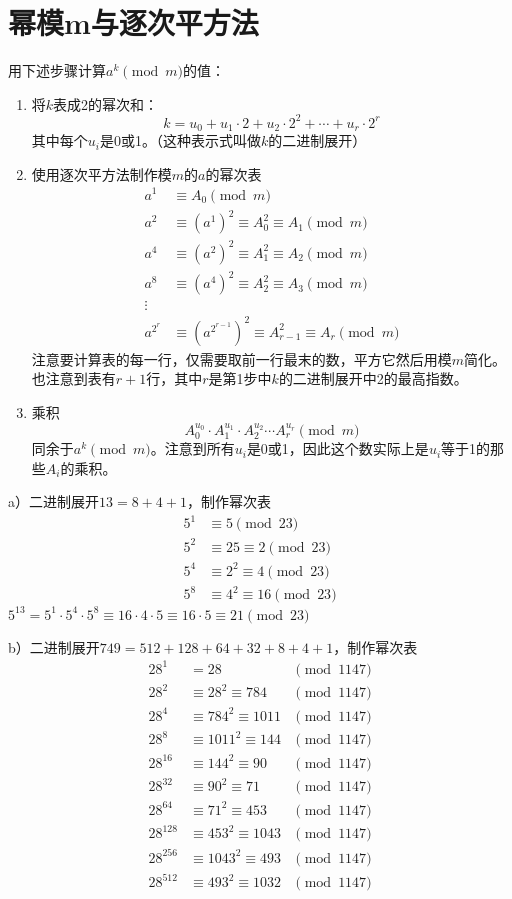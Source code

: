 \chapter{幂模m与逐次平方法}
\begin{algorithm}
用下述步骤计算$a^k\pmod m$的值：
\begin{enumerate}
\item 将$k$表成2的幂次和：
\[k=u_0+u_1\cdot2+u_2\cdot2^2+\cdots+u_r\cdot2^r\]
其中每个$u_i$是0或1。（这种表示式叫做$k$的二进制展开）
\item 使用逐次平方法制作模$m$的$a$的幂次表
\begin{align*}
a^1&\equiv A_0\pmod m\\
a^2&\equiv(a^1)^2\equiv A_0^2\equiv A_1\pmod m\\
a^4&\equiv(a^2)^2\equiv A_1^2\equiv A_2\pmod m\\
a^8&\equiv(a^4)^2\equiv A_2^2\equiv A_3\pmod m\\
\vdots\\
a^{2^r}&\equiv(a^{2^{r-1}})^2\equiv A_{r-1}^2\equiv A_r\pmod m
\end{align*}
注意要计算表的每一行，仅需要取前一行最末的数，平方它然后用模$m$简化。也注意到表有$r+1$行，其中$r$是第1步中$k$的二进制展开中2的最高指数。
\item 乘积
\[A_0^{u_0}\cdot A_1^{u_1}\cdot A_2^{u_2}\cdots A_r^{u_r}\pmod m\]
同余于$a^k\pmod m$。注意到所有$u_i$是0或1，因此这个数实际上是$u_i$等于1的那些$A_i$的乘积。
\end{enumerate}
\end{algorithm}
%
\exercise a）二进制展开$13=8+4+1$，制作幂次表
\begin{align*}
5^1&\equiv 5\pmod{23}\\
5^2&\equiv 25 \equiv 2\pmod{23}\\
5^4&\equiv2^2\equiv 4\pmod{23}\\
5^8&\equiv4^2\equiv 16\pmod{23}
\end{align*}
$5^{13}=5^1\cdot5^4\cdot5^8\equiv 16\cdot4\cdot5\equiv16\cdot5\equiv21\pmod{23}$\par
b）二进制展开$749=512+128+64+32+8+4+1$，制作幂次表
\begin{align*}
28^1&= 28&\pmod{1147}\\
28^2&\equiv 28^2\equiv784&\pmod{1147}\\
28^4&\equiv 784^2\equiv 1011&\pmod{1147}\\
28^8&\equiv 1011^2\equiv 144&\pmod{1147}\\
28^{16}&\equiv 144^2\equiv 90&\pmod{1147}\\
28^{32}&\equiv 90^2\equiv 71&\pmod{1147}\\
28^{64}&\equiv 71^2\equiv 453&\pmod{1147}\\
28^{128}&\equiv 453^2\equiv 1043&\pmod{1147}\\
28^{256}&\equiv 1043^2\equiv 493&\pmod{1147}\\
28^{512}&\equiv 493^2\equiv 1032&\pmod{1147}
\end{align*}
